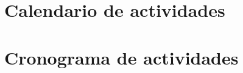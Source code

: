 \documentclass[6pt,letterpaper,final]{article}
\begin{document}
    \section*{Calendario de actividades}
    
    \section*{Cronograma de actividades}
    
    \clearpage
\end{document}
